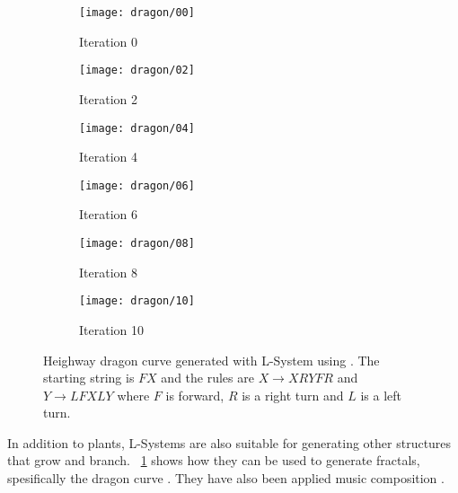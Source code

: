 \begin{figure}[!ht]
    \centering
    \begin{subfigure}{0.32\textwidth}
        \centering
        \texttt{[image: dragon/00]}
        \caption{Iteration 0}
    \end{subfigure}
    \begin{subfigure}{0.32\textwidth}
        \centering
        \texttt{[image: dragon/02]}
        \caption{Iteration 2}
    \end{subfigure}
    \begin{subfigure}{0.32\textwidth}
        \centering
        \texttt{[image: dragon/04]}
        \caption{Iteration 4}
    \end{subfigure}
    \par\bigskip
    \begin{subfigure}{0.32\textwidth}
        \centering
        \texttt{[image: dragon/06]}
        \caption{Iteration 6}
    \end{subfigure}
    \begin{subfigure}{0.32\textwidth}
        \centering
        \texttt{[image: dragon/08]}
        \caption{Iteration 8}
    \end{subfigure}
    \begin{subfigure}{0.32\textwidth}
        \centering
        \texttt{[image: dragon/10]}
        \caption{Iteration 10}
    \end{subfigure}
    \caption[Dragon curve]{
        Heighway dragon curve generated with L-System using \cite{lsystemgenerator}.
        The starting string is $FX$ and the rules are $X \rightarrow XRYFR$ and $Y \rightarrow LFXLY$ where $F$ is forward, $R$ is a right turn and $L$ is a left turn\footnotemark.
    }
    \label{fig:dragon-curve}
\end{figure}


In addition to plants, L-Systems are also suitable for generating other structures that grow and branch.
\figurename~\ref{fig:dragon-curve} shows how they can be used to generate fractals, spesifically the dragon curve \cite{gardner1967heighway}.
They have also been applied music composition \cite{manousakis2006musical}.


